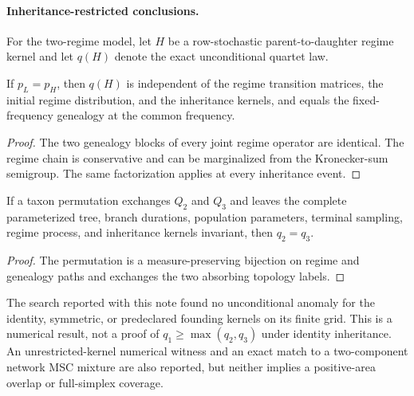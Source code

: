 \paragraph{Inheritance-restricted conclusions.}
For the two-regime model, let $H$ be a row-stochastic parent-to-daughter
regime kernel and let $q(H)$ denote the exact unconditional quartet law.

\begin{proposition}
If $p_L=p_H$, then $q(H)$ is independent of the regime transition matrices,
the initial regime distribution, and the inheritance kernels, and equals the
fixed-frequency genealogy at the common frequency.
\end{proposition}

\begin{proof}
The two genealogy blocks of every joint regime operator are identical. The
regime chain is conservative and can be marginalized from the Kronecker-sum
semigroup. The same factorization applies at every inheritance event.
\end{proof}

\begin{proposition}
If a taxon permutation exchanges $Q_2$ and $Q_3$ and leaves the complete
parameterized tree, branch durations, population parameters, terminal
sampling, regime process, and inheritance kernels invariant, then $q_2=q_3$.
\end{proposition}

\begin{proof}
The permutation is a measure-preserving bijection on regime and genealogy
paths and exchanges the two absorbing topology labels.
\end{proof}

The search reported with this note found no unconditional anomaly for the
identity, symmetric, or predeclared founding kernels on its finite grid. This
is a numerical result, not a proof of $q_1\geq\max(q_2,q_3)$ under identity
inheritance. An unrestricted-kernel numerical witness and an exact match to a
two-component network MSC mixture are also reported, but neither implies a
positive-area overlap or full-simplex coverage.
